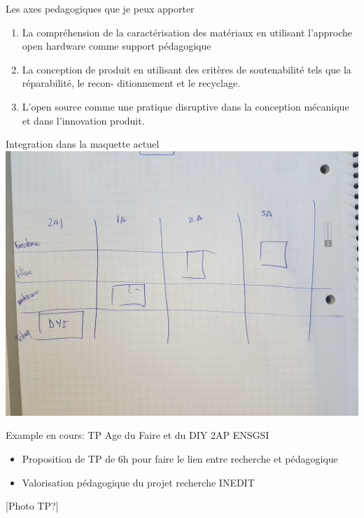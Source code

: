 \documentclass[
  11pt,
  ignorenonframetext,
  aspectratio=169,
  c]{beamer}
\providecommand{\tightlist}{%
  \setlength{\itemsep}{0pt}\setlength{\parskip}{0pt}}\usepackage{longtable,booktabs,array}
\begin{document}
\begin{frame}{Les axes pedagogiques que je peux apporter}
\protect\hypertarget{les-axes-pedagogiques-que-je-peux-apporter}{}
\begin{enumerate}
\item
  La compréhension de la caractérisation des matériaux en utilisant
  l'approche open hardware comme support pédagogique
\item
  La conception de produit en utilisant des critères de soutenabilité
  tels que la réparabilité, le recon- ditionnement et le recyclage.
\item
  L'open source comme une pratique disruptive dans la conception
  mécanique et dans l'innovation produit.
\end{enumerate}
\end{frame}

\begin{frame}{Integration dans la maquette actuel}
\protect\hypertarget{integration-dans-la-maquette-actuel}{}
\includegraphics{figures/slides/Projet-pedagogique.jpg}
\end{frame}

\begin{frame}{Example en cours: TP Age du Faire et du DIY \hfill 2AP
ENSGSI}
\protect\hypertarget{example-en-cours-tp-age-du-faire-et-du-diy-2ap-ensgsi}{}
\begin{itemize}
\tightlist
\item
  Proposition de TP de 6h pour faire le lien entre recherche et
  pédagogique
\item
  Valorisation pédagogique du projet recherche INEDIT
\end{itemize}

{[}Photo TP?{]}
\end{frame}
\end{document}
